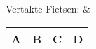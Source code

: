 Vertakte Fietsen: &
\begin{tabular}{|c|c|c|c|}
	\hline
	\textbf{A} & \textbf{B} & \textbf{C} & \textbf{D} \\
	\hline
\end{tabular} \\